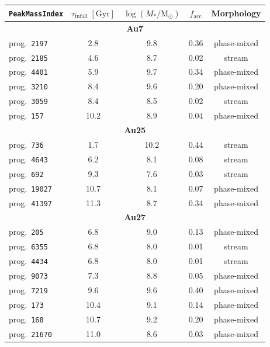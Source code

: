 \begin{table}
    \centering
    \begin{tabular}{l|c|c|c|c}
        \hline
        \texttt{PeakMassIndex} & $\tau_{\mathrm{infall}} \; [\mathrm{Gyr}]$ & $\log(M_*/\mathrm{M}_{\odot})$ & $f_{\mathrm{acc}}$ &
        Morphology\\
        \hline
        \multicolumn{5}{c}{{\bf Au7}} \\
        prog.~\texttt{2197} & 2.8 & 9.8 & 0.36 & phase-mixed \\
        prog.~\texttt{2185} & 4.6 & 8.7 & 0.02 & stream \\
        prog.~\texttt{4401} & 5.9 & 9.7 & 0.34 & phase-mixed \\
        prog.~\texttt{3210} & 8.4 & 9.6 & 0.20 & phase-mixed \\
        prog.~\texttt{3059} & 8.4 & 8.5 & 0.02 & stream \\
        prog.~\texttt{157} & 10.2 & 8.9 & 0.04 & phase-mixed \\
        \hline
        \multicolumn{5}{c}{{\bf Au25}} \\
        prog.~\texttt{736} & 1.7 & 10.2 & 0.44 & stream \\
        prog.~\texttt{4643} & 6.2 & 8.1 & 0.08 & stream \\
        prog.~\texttt{692} & 9.3 & 7.6 & 0.03 & stream \\
        prog.~\texttt{19027} & 10.7 & 8.1 & 0.07 & phase-mixed \\
        prog.~\texttt{41397} & 11.3 & 8.7 & 0.34 & phase-mixed \\
        \hline
        \multicolumn{5}{c}{{\bf Au27}} \\
        prog.~\texttt{205} & 6.8 & 9.0 & 0.13 & phase-mixed \\
        prog.~\texttt{6355} & 6.8 & 8.0 & 0.01 & stream \\
        prog.~\texttt{4434} & 6.8 & 8.0 & 0.01 & stream \\
        prog.~\texttt{9073} & 7.3 & 8.8 & 0.05 & phase-mixed \\
        prog.~\texttt{7219} & 9.6 & 9.6 & 0.40 & phase-mixed \\
        prog.~\texttt{173} & 10.4 & 9.1 & 0.14 & phase-mixed \\
        prog.~\texttt{168} & 10.7 & 9.2 & 0.20 & phase-mixed \\
        prog.~\texttt{21670} & 11.0 & 8.6 & 0.03 & phase-mixed \\
        \hline
    \end{tabular}

\end{table}
